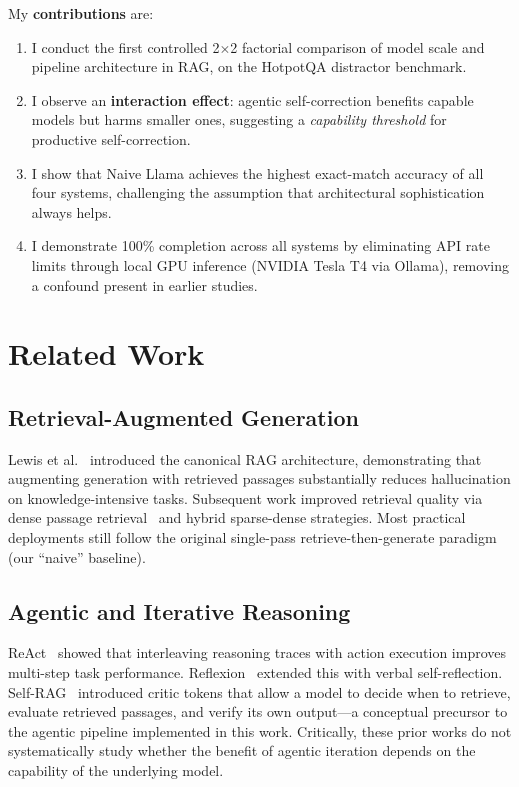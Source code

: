 \documentclass[12pt]{article}
\begin{document}
My \textbf{contributions} are:
\begin{enumerate}
    \item I conduct the first controlled 2$\times$2 factorial comparison of
          model scale and pipeline architecture in RAG, on the HotpotQA
          distractor benchmark.
    \item I observe an \textbf{interaction effect}: agentic
          self-correction benefits capable models but harms smaller ones,
          suggesting a \emph{capability threshold} for productive self-correction.
    \item I show that Naive Llama achieves the highest exact-match accuracy
          of all four systems, challenging the assumption that architectural
          sophistication always helps.
    \item I demonstrate 100\% completion across all systems by eliminating
          API rate limits through local GPU inference (NVIDIA Tesla T4 via
          Ollama), removing a confound present in earlier studies.
\end{enumerate}

\section{Related Work}

\subsection{Retrieval-Augmented Generation}
Lewis et al.~\cite{lewis2020retrieval} introduced the canonical RAG architecture,
demonstrating that augmenting generation with retrieved passages substantially
reduces hallucination on knowledge-intensive tasks.  Subsequent work improved
retrieval quality via dense passage retrieval~\cite{karpukhin2020dense} and
hybrid sparse-dense strategies.  Most practical deployments still follow the
original single-pass retrieve-then-generate paradigm (our ``naive'' baseline).

\subsection{Agentic and Iterative Reasoning}
ReAct~\cite{yao2022react} showed that interleaving reasoning traces with
action execution improves multi-step task performance.  Reflexion~\cite{shinn2023reflexion}
extended this with verbal self-reflection.  Self-RAG~\cite{asai2023selfrag}
introduced critic tokens that allow a model to decide when to retrieve,
evaluate retrieved passages, and verify its own output---a conceptual precursor
to the agentic pipeline implemented in this work.  Critically, these prior
works do not systematically study whether the benefit of agentic iteration
depends on the capability of the underlying model.
\end{document}
